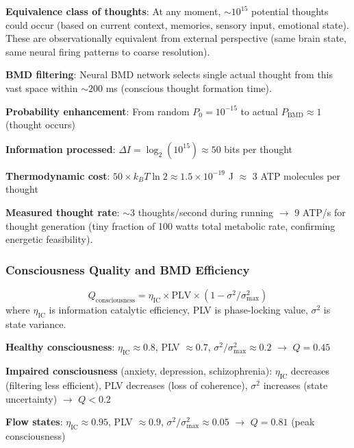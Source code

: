 \documentclass[11pt,onecolumn]{article}
\begin{document}
\textbf{Equivalence class of thoughts}: At any moment, $\sim 10^{15}$ potential thoughts could occur (based on current context, memories, sensory input, emotional state). These are observationally equivalent from external perspective (same brain state, same neural firing patterns to coarse resolution).

\textbf{BMD filtering}: Neural BMD network selects single actual thought from this vast space within $\sim 200$ ms (conscious thought formation time).

\textbf{Probability enhancement}: From random $P_0 = 10^{-15}$ to actual $P_{\text{BMD}} \approx 1$ (thought occurs)

\textbf{Information processed}: $\Delta I = \log_2(10^{15}) \approx 50$ bits per thought

\textbf{Thermodynamic cost}: $50 \times k_B T \ln 2 \approx 1.5 \times 10^{-19}$ J $\approx$ 3 ATP molecules per thought

\textbf{Measured thought rate}: $\sim 3$ thoughts/second during running $\to$ 9 ATP/s for thought generation (tiny fraction of 100 watts total metabolic rate, confirming energetic feasibility).

\subsubsection{Consciousness Quality and BMD Efficiency}

\begin{definition}
\begin{equation}
Q_{\text{consciousness}} = \eta_{\text{IC}} \times \text{PLV} \times (1 - \sigma^2/\sigma_{\max}^2)
\end{equation}
where $\eta_{\text{IC}}$ is information catalytic efficiency, PLV is phase-locking value, $\sigma^2$ is state variance.
\end{definition}

\textbf{Healthy consciousness}: $\eta_{\text{IC}} \approx 0.8$, PLV $\approx 0.7$, $\sigma^2/\sigma_{\max}^2 \approx 0.2$ $\to$ $Q = 0.45$

\textbf{Impaired consciousness} (anxiety, depression, schizophrenia): $\eta_{\text{IC}}$ decreases (filtering less efficient), PLV decreases (loss of coherence), $\sigma^2$ increases (state uncertainty) $\to$ $Q < 0.2$

\textbf{Flow states}: $\eta_{\text{IC}} \approx 0.95$, PLV $\approx 0.9$, $\sigma^2/\sigma_{\max}^2 \approx 0.05$ $\to$ $Q = 0.81$ (peak consciousness)
\end{document}
